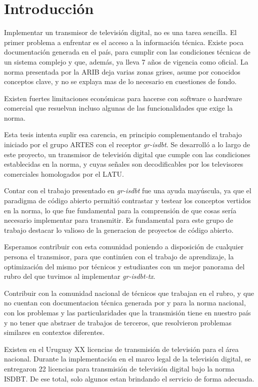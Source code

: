 \chapter{Introducción}

Implementar un transmisor de televisión digital, no es una tarea sencilla. El primer problema a enfrentar es el acceso a la información técnica. Existe poca documentación generada en el país, para cumplir con las condiciones técnicas de un sistema complejo y que, además, ya lleva 7 años de vigencia como oficial. La norma presentada por la ARIB deja varias zonas grises, asume por conocidos conceptos clave, y no se explaya mas de lo necesario en cuestiones de fondo. 

Existen fuertes limitaciones económicas para hacerse con software o hardware comercial que resuelvan incluso algunas de las funcionalidades que exige la norma. 

Esta tesis intenta suplir esa carencia, en principio complementando el trabajo iniciado por el grupo ARTES con el receptor \textit{gr-isdbt}. Se desarrolló a lo largo de este proyecto, un transmisor de televisión digital que cumple con las condiciones establecidas en la norma, y cuyas señales son decodificables por los televisores comerciales homologados por el LATU.

Contar con el trabajo presentado en \textit{gr-isdbt} fue una ayuda mayúscula, ya que el paradigma de código abierto permitió contrastar y testear los conceptos vertidos en la norma, lo que fue fundamental para la comprensión de que cosas sería necesario implementar para transmitir. Es fundamental para este grupo de trabajo destacar lo valioso de la generacion de proyectos de código abierto.

Esperamos contribuir con esta comunidad poniendo a disposición de cualquier persona el transmisor, para que continúen con el trabajo de aprendizaje, la optimización del mismo por técnicos y estudiantes con un mejor panorama del rubro del que tuvimos al implementar \textit{gr-isdbt-tx}.

Contribuir con la comunidad nacional de técnicos que trabajan en el rubro, y que no cuentan con documentacion técnica generada por y para la norma nacional, con los problemas y las particularidades que la transmisión tiene en nuestro país y no tener que abstraer de trabajos de terceros, que resolvieron problemas similares en contextos diferentes.

Existen en el Uruguay XX licencias de transmisión de televisión para el área nacional. Durante la implementación en el marco legal de la televisión digital, se entregaron 22 licencias para transmisión de televisión digital bajo la norma ISDBT. De ese total, solo algunos estan brindando el servicio de forma adecuada.

